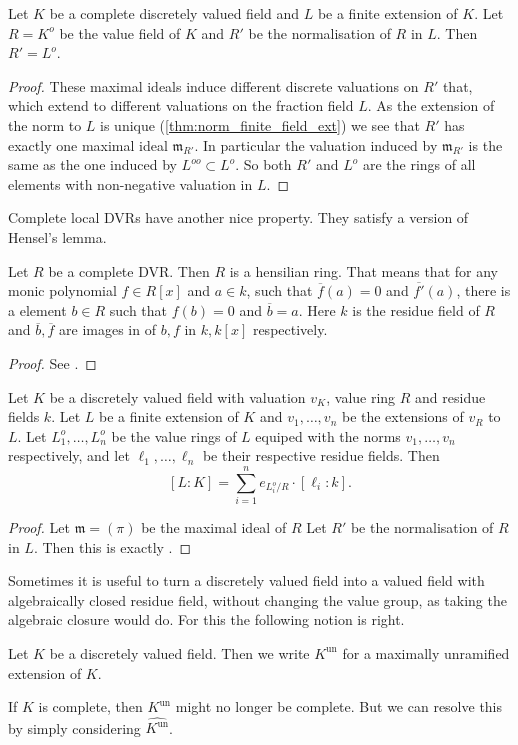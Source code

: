 \begin{lemma}
	Let $K$ be a complete discretely valued field and $L$ be a finite extension of $K$.	Let $R = K^{o}$  be the value field of $K$ and $R'$ be the normalisation of $R$ in $L$. 
	Then $R' = L^{o}$. 
\end{lemma}
\begin{proof}
	These maximal ideals induce different discrete valuations on $R'$ that, which extend to different valuations on the fraction field $L$. 
	As the extension of the norm to $L$ is unique (\cref{thm:norm_finite_field_ext}) we see that $R'$ has exactly one maximal ideal $\mathfrak{m}_{R'}$. 
	In particular the valuation induced by $\mathfrak{m}_{R'} $ is the same as the one induced by $L^{oo} \subset L^{o}$. 
	So both $R'$ and $L^{o}$ are the rings of all elements with non-negative valuation in $L$. 
\end{proof}

Complete local DVRs have another nice property. They satisfy a version of Hensel's lemma. 
\begin{lemma}
	Let $R$ be a complete DVR. 
	Then $R$ is a hensilian ring.
	That means that for any monic polynomial $f \in R[x]$ and  $a \in k$, such that $\overline{f}(a) = 0$ and $\overline{f'}(a)$, there is a element $b \in R$ such that $f(b) = 0$ and $\overline{b} = a$.
	Here $k$ is the residue field of $R$ and $\overline{b}, \overline{f}$ are images in of $b, f$ in $k, k[x ]$ respectively. 
\end{lemma}
\begin{proof}
	See .
\end{proof}


\begin{proposition}\label{prop:balancing_valuations}
	Let $K$ be a discretely valued field with valuation $v_K$,  value ring $R$ and residue fields $k$. 
	Let $L$ be a finite extension of $K$ and $v_1, \ldots, v_n$ be the extensions of $v_R$ to $L$. 
	Let $L_1^{o}, \ldots, L_n^{o}$ be the value rings of $L$ equiped with the norms $v_1, \ldots, v_n$ respectively, and let $\ell_1, \ldots, \ell_n$ be their respective residue fields. 
	Then \[
		[L: K] = \sum_{i= 1}^{n} e_{L_i^{o} / R} \cdot [\ell_i: k]
	.\] 
\end{proposition}
\begin{proof}
	Let $\mathfrak{m} = (\pi) $ be the maximal ideal of $R$
	Let $R'$ be the normalisation of $R$ in $L$. 
	Then this is exactly .
\end{proof}

Sometimes it is useful to turn a discretely valued field into a valued field with algebraically closed residue field, without changing the value group, as taking the algebraic closure would do. 
For this the following notion is right. 
\begin{definition}
	Let $K$ be a discretely valued field. 
	Then we write $K^{\text{un}}$ for a maximally unramified extension of $K$. 
\end{definition}
If $K$ is complete, then $K^{\text{un}}$ might no longer be complete. But we can resolve this by simply considering $\hat{K^{\text{un}}}$. 
 
